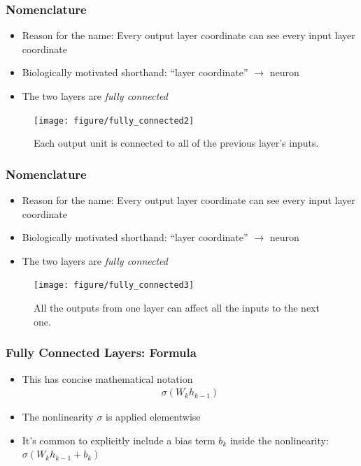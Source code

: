 \documentclass[10pt,mathserif]{beamer}
\begin{document}
\begin{frame}
  \frametitle{Nomenclature}
  \begin{itemize}
  \item Reason for the name: Every output layer coordinate can see every input
    layer coordinate
  \item Biologically motivated shorthand: ``layer coordinate'' $\rightarrow$ neuron
  \item The two layers are \textit{fully connected}
  \end{itemize}
\begin{figure}
  \centering
  \texttt{[image: figure/fully\_connected2]}
  \caption{Each output unit is connected to all of the previous layer's inputs.}
\end{figure}
\end{frame}

\begin{frame}
  \frametitle{Nomenclature}
  \begin{itemize}
  \item Reason for the name: Every output layer coordinate can see every input
    layer coordinate
  \item Biologically motivated shorthand: ``layer coordinate'' $\rightarrow$ neuron
  \item The two layers are \textit{fully connected}
  \end{itemize}
\begin{figure}
  \centering
  \texttt{[image: figure/fully\_connected3]}
  \caption{All the outputs from one layer can affect all the inputs to the next
    one. \label{fig:fully_connected3}}
\end{figure}
\end{frame}

\begin{frame}
  \frametitle{Fully Connected Layers: Formula}
  \begin{itemize}
  \item This has concise mathematical notation
    \begin{align*}
      \sigma\left(W_{k}h_{k - 1}\right)
    \end{align*}
  \item The nonlinearity $\sigma$ is applied elementwise
  \item It's common to explicitly include a bias term $b_{k}$ inside the
    nonlinearity: $\sigma\left(W_k h_{k - 1} + b_k\right)$
  \end{itemize}
\end{frame}
\end{document}
